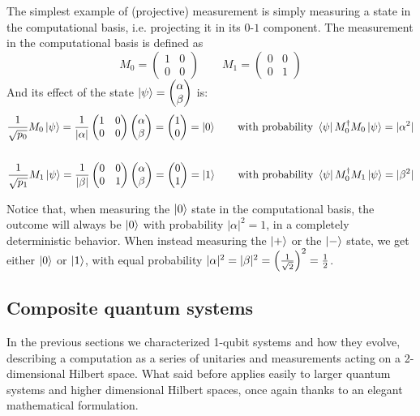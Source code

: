 The simplest example of (projective) measurement is simply measuring a state in the computational basis, i.e. projecting it in its $0$-$1$ component. The measurement in the computational basis is defined as \[ M_0 = \begin{pmatrix} 1 & 0 \\ 0 & 0\end{pmatrix} \qquad
M_1 = \begin{pmatrix}0 & 0 \\ 0 & 1\end{pmatrix} \]
And its effect of the state $\ket{\psi} = \begin{pmatrix}\alpha \\ \beta \end{pmatrix}$ is:
\begin{align*}
\frac{1}{\sqrt{p_0}}M_0\ket{\psi} = \frac{1}{|\alpha|}\begin{pmatrix} 1 & 0 \\ 0 & 0\end{pmatrix}
\begin{pmatrix}\alpha \\ \beta \end{pmatrix} = \begin{pmatrix} 1 \\ 0 \end{pmatrix} = \ket{0} 
\qquad \text{with probability } \bra{\psi}M_0^\dagger M_0\ket{\psi} = |\alpha^2| \\
\\
\frac{1}{\sqrt{p_1}}M_1\ket{\psi} = \frac{1}{|\beta|}\begin{pmatrix} 0 & 0 \\ 0 & 1\end{pmatrix}
\begin{pmatrix}\alpha \\ \beta \end{pmatrix} = \begin{pmatrix} 0 \\ 1 \end{pmatrix} = \ket{1} 
\qquad \text{with probability } \bra{\psi}M_0^\dagger M_1\ket{\psi} = |\beta^2|
\end{align*}

Notice that, when measuring the $\ket{0}$ state in the computational basis, the outcome will always be $\ket{0}$ with probability $|\alpha|^2 = 1$, in a completely deterministic behavior. 
When instead measuring the $\ket{+}$ or the $\ket{-}$ state, we get either $\ket{0}$ or $\ket{1}$, with equal probability $|\alpha|^2 = |\beta|^2 = \left(\frac{1}{\sqrt{2}}\right)^2 = \frac{1}{2}$.
\subsection{Composite quantum systems}
In the previous sections we characterized 1-qubit systems and how they evolve, describing a computation as a series of unitaries and measurements acting on a 2-dimensional Hilbert space. What said before applies easily to larger quantum systems and higher dimensional Hilbert spaces, once again thanks to an elegant mathematical formulation.

